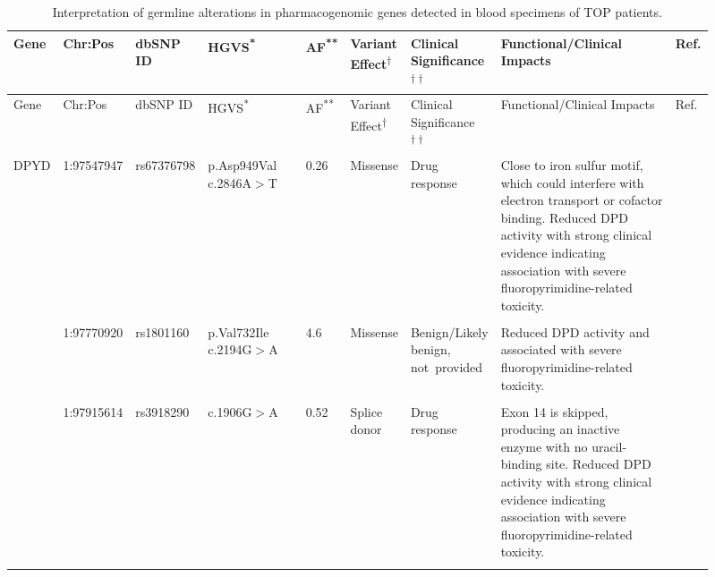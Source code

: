 \begin{landscape}

\begin{longtable}{p{0.07\linewidth}|p{0.09\linewidth}p{0.085\linewidth}p{0.14\linewidth}p{0.05\linewidth}p{0.065\linewidth}p{0.11\linewidth}p{0.25\linewidth}p{0.05\linewidth}}
	\caption{Interpretation of germline alterations in pharmacogenomic genes detected in blood specimens of TOP patients.}
	\label{tbl:germline_pgx_genes}
	\\
	\hline
	Gene & Chr:Pos & dbSNP ID & HGVS\textsuperscript{*} & AF\textsuperscript{**} & Variant Effect\textsuperscript{$\dagger$} & Clinical Significance\textsuperscript{$\dagger\dagger$} & Functional/Clinical Impacts & Ref.
	\\
	\hline
  \endfirsthead
  \hline
	Gene & Chr:Pos & dbSNP ID & HGVS\textsuperscript{*} & AF\textsuperscript{**} & Variant Effect\textsuperscript{$\dagger$} & Clinical Significance\textsuperscript{$\dagger\dagger$} & Functional/Clinical Impacts & Ref.
	\\
	\hline
  \endhead
	DPYD & 1:97547947 & rs67376798 & p.Asp949Val c.2846A$>$T & 0.26 & Missense & Drug response
	&
	 Close to iron sulfur motif, which could interfere with electron transport or cofactor binding. Reduced DPD activity with strong clinical evidence indicating association with severe fluoropyrimidine-related toxicity.
	&
	\cite{VanKuilenburg2016, Toffoli2015, Lee2014, Deenen2011, Kuilenburg2000, Swen2011, Caudle2013, Amstutz2009, Schwab2008, Morel2006, Mattison2002, Dobritzsch2001, Boige2016, Offer2014, Meulendijks2015}
	\\
	\\
	& 1:97770920 & rs1801160 & p.Val732Ile c.2194G$>$A & 4.6 & Missense & Benign/Likely benign, \mbox{not provided} & Reduced DPD activity and associated with severe fluoropyrimidine-related toxicity. & \cite{Schwab2008, Kuilenburg2000, Gentile2016, Deenen2011, Boige2016, VanKuilenburg2016}
	\\
	\\
	& 1:97915614 & rs3918290 & c.1906G$>$A & 0.52 & Splice donor & Drug response & Exon 14 is skipped, producing an inactive enzyme with no uracil-binding site. Reduced DPD activity with strong clinical evidence indicating association with severe fluoropyrimidine-related toxicity. & \cite{Toffoli2015, Lee2014, Caudle2013, Swen2011, Kuilenburg2000, Deenen2011, Amstutz2009, Schwab2008, Morel2006, Gentile2016, VanKuilenburg2016, Meulendijks2015}
	\\
	\\

\end{longtable}
\end{landscape}

